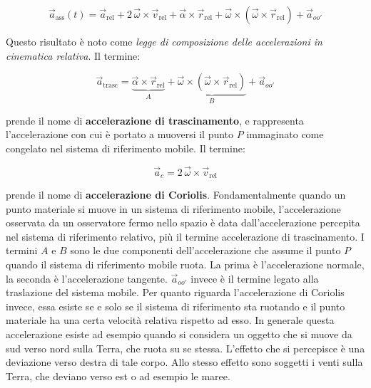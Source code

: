 \begin{equation}
	\boxed{\vec{a}_{\text{ass}}(t)=\vec{a}_{\text{rel}} +2\,\vec{\omega} \times \vec{v}_{\text{rel}}+\vec{\alpha}\times \vec{r}_{\text{rel}}+ \vec{\omega}\times({\vec{\omega}}\times \vec{r}_{\text{rel}})+\vec{a}_{oo'}}
\end{equation}

Questo risultato è noto come \emph{legge di composizione delle accelerazioni in cinematica relativa}. Il termine:

\[
	\vec{a}_{\text{trasc}}=\underbrace{\vec{\alpha}\times \vec{r}_{\text{rel}}}_A+ \underbrace{\vec{\omega}\times({\vec{\omega}}\times \vec{r}_{\text{rel}})}_B+\vec{a}_{oo'}
\]

prende il nome di \textbf{accelerazione di trascinamento}, e rappresenta l'accelerazione con cui è portato a muoversi il punto $P$ immaginato come congelato nel sistema di riferimento mobile. Il termine:

\[
	\vec{a}_c= 2\,\vec{\omega} \times \vec{v}_{\text{rel}}
\]

prende il nome di \textbf{accelerazione di Coriolis}.
Fondamentalmente quando un punto materiale si muove in un sistema di riferimento mobile, l'accelerazione osservata da un osservatore fermo nello spazio è data dall'accelerazione percepita nel sistema di riferimento relativo, più il termine accelerazione di trascinamento.
I termini $A$ e $B$ sono le due componenti dell'accelerazione che assume il punto $P$ quando il sistema di riferimento mobile ruota. La prima è l'accelerazione normale, la seconda è l'accelerazione tangente. $\vec{a}_{oo'}$ invece è il termine legato alla traslazione del sistema mobile.
Per quanto riguarda l'accelerazione di Coriolis invece, essa esiste se e solo se il sistema di riferimento sta ruotando e il punto materiale ha una certa velocità relativa rispetto ad esso. In generale questa accelerazione esiste ad esempio quando si considera un oggetto che si muove da sud verso nord sulla Terra, che ruota su se stessa. L'effetto che si percepisce è una deviazione verso destra di tale corpo. Allo stesso effetto sono soggetti i venti sulla Terra, che deviano verso est o ad esempio le maree.